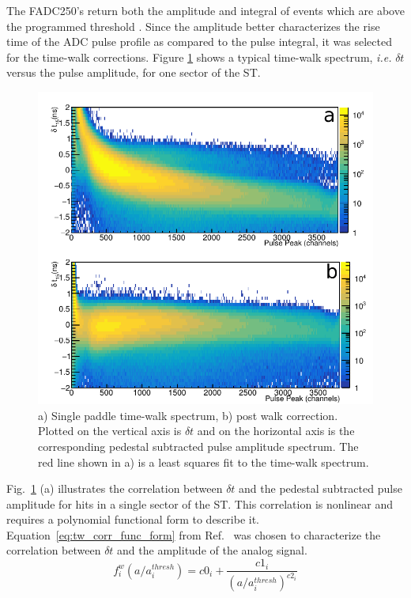 The FADC250's return both the amplitude and integral of events which are above the programmed threshold \cite{dong_fadc}.  Since the amplitude better characterizes the rise time of the ADC pulse profile as compared to the pulse integral, it was selected for the time-walk corrections.  Figure \ref{fig:time_walk} shows a typical time-walk spectrum, \textit{i.e.} $\delta t$ versus the pulse amplitude, for one sector of the ST.
	\begin{figure}[!htb]
		\centering
		\includegraphics[width=1.0\columnwidth]{calibration/figs/NIM_TW.pdf}
		\caption{a) Single paddle time-walk spectrum, b) post walk correction.  Plotted on the vertical axis is $\delta t$ and on the horizontal axis is the corresponding pedestal subtracted pulse amplitude spectrum.  The red line shown in a) is a least squares fit to the time-walk spectrum.}
		\label{fig:time_walk}
	\end{figure}

Fig.~\ref{fig:time_walk} (a) illustrates the correlation between $\delta t$ and the pedestal subtracted pulse amplitude for hits in a single sector of the ST.  This correlation is nonlinear and requires a polynomial functional form to describe it. Equation~\ref{eq:tw_corr_func_form} from Ref.~\cite{esmith_bcal} was chosen to characterize the correlation between $\delta t$ and the amplitude of the analog signal. 
	\begin{equation} \label{eq:tw_corr_func_form}
		f^{w}_{i}\left(a/a^{thresh}_{i}\right) = c0_{i} + \frac{c1_{i}}{(a/a^{thresh}_{i})^{c2_{i}}}
	\end{equation}

